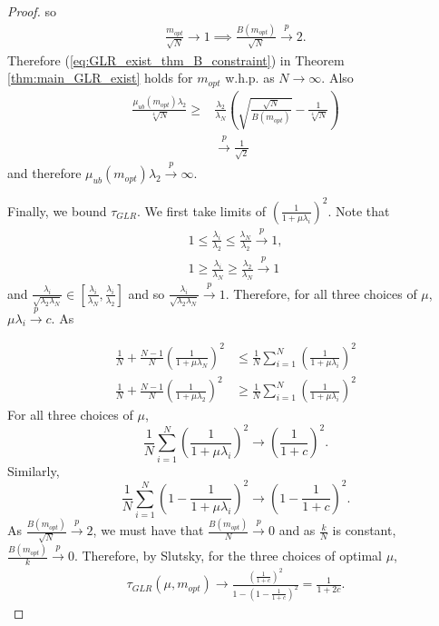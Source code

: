 \begin{proof}
so 
\begin{align}
 \frac{m_{opt}}{\sqrt{N}} \to 1 \implies \frac{B(m_{opt})}{\sqrt{N}} \overset{p}{\to} 2.  \label{eq:Proof_GLR_big_N:B_mopt}
\end{align}
Therefore (\ref{eq:GLR_exist_thm_B_constraint}) in Theorem \ref{thm:main_GLR_exist} holds for $m_{opt}$ w.h.p. as $N \to \infty$.
Also
\begin{align} \frac{\mu_{ub}\left(m_{opt}\right)\lambda_{2}}{\sqrt[4]{N}} \geq &\frac{\lambda_{2}}{\lambda_{N}} \left( \sqrt{\frac{\sqrt{N}}{B(m_{opt})}}-\frac{1}{\sqrt[4]{N}} \right) \\
&\overset{p}{\to} \frac{1}{\sqrt{2}}
\end{align}
and therefore ${\mu_{ub}\left(m_{opt}\right)\lambda_{2}} \overset{p}{\to} \infty$.

Finally, we bound $\tau_{GLR}$. We first take limits of $\left(\frac{1}{1 + \mu\lambda_{i}}\right)^{2}$. Note that
\begin{align}
    1 \leq \frac{\lambda_{i}}{\lambda_{2}} \leq \frac{\lambda_{N}}{\lambda_{2}} \overset{p}{\to} 1, \\
    1 \geq \frac{\lambda_{i}}{\lambda_{N}} \geq \frac{\lambda_{2}}{\lambda_{N}} \overset{p}{\to} 1
\end{align}
and $\frac{\lambda_{i}}{\sqrt{\lambda_{2}\lambda_{N}}} \in \left[ \frac{\lambda_{i}}{\lambda_{N}}, \frac{\lambda_{i}}{\lambda_{2}} \right]$ and so $\frac{\lambda_{i}}{\sqrt{\lambda_{2}\lambda_{N}}} \overset{p}{\to} 1$. Therefore, for all three choices of $\mu$, $\mu\lambda_{i} \overset{p}{\to} c$. As

\begin{align}
    \frac{1}{N} + \frac{N-1}{N}\left(\frac{1}{1 + \mu\lambda_{N}}\right)^{2} &\leq \frac{1}{N}\sum_{i = 1}^{N}\left(\frac{1}{1+  \mu \lambda_{i}} \right)^{2} \\
    \frac{1}{N} + \frac{N-1}{N}\left(\frac{1}{1 + \mu\lambda_{2}}\right)^{2} &\geq \frac{1}{N}\sum_{i = 1}^{N}\left(\frac{1}{1+  \mu \lambda_{i}} \right)^{2}
\end{align}
For all three choices of $\mu$, 
\begin{equation}
    \frac{1}{N}\sum_{i = 1}^{N}\left(\frac{1}{1+  \mu \lambda_{i}} \right)^{2} \to \left(\frac{1}{1 + c}\right)^{2}.
\end{equation}
Similarly,
\begin{equation}
    \frac{1}{N}\sum_{i = 1}^{N}\left(1 - \frac{1}{1+  \mu \lambda_{i}} \right)^{2} \to \left(1 - \frac{1}{1 + c}\right)^{2}.
\end{equation}
As $\frac{B(m_{opt})}{\sqrt{N}} \overset{p}{\to} 2$, we must have that $\frac{B(m_{opt})}{{N}} \overset{p}{\to} 0$ and as $\frac{k}{N}$ is constant, $\frac{B(m_{opt})}{k} \overset{p}{\to} 0$. Therefore, by Slutsky, for the three choices of optimal $\mu$,
\begin{align}
    \tau_{GLR}(\mu,m_{opt}) \to \frac{\left(\frac{1}{1 + c}\right)^{2}}{1 - \left(1 - \frac{1}{1 + c}\right)^{2}} = \frac{1}{1+2c}.
\end{align}
\end{proof}
\iffalse
